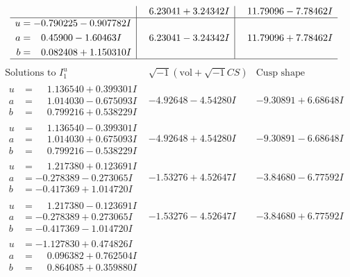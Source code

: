 \documentclass[1p]{elsarticle_modified}
\theoremstyle{definition}
\newcommand{\I}{\sqrt{-1}}
\begin{document}
$$\begin{array}{c|c|c}
 & \phantom{-}6.23041 + 3.24342 I & \phantom{-}11.79096 - 7.78462 I \\ \hline\begin{aligned}
u &= -0.790225 - 0.907782 I \\
a &= \phantom{-}0.45900 - 1.60463 I \\
b &= \phantom{-}0.082408 + 1.150310 I\end{aligned}
 & \phantom{-}6.23041 - 3.24342 I & \phantom{-}11.79096 + 7.78462 I\\
 \hline 
 \end{array}$$\newpage$$\begin{array}{c|c|c}  
\text{Solutions to }I^u_{1}& \I (\text{vol} + \sqrt{-1}CS) & \text{Cusp shape}\\
 \hline 
\begin{aligned}
u &= \phantom{-}1.136540 + 0.399301 I \\
a &= \phantom{-}1.014030 - 0.675093 I \\
b &= \phantom{-}0.799216 + 0.538229 I\end{aligned}
 & -4.92648 - 4.54280 I & -9.30891 + 6.68648 I \\ \hline\begin{aligned}
u &= \phantom{-}1.136540 - 0.399301 I \\
a &= \phantom{-}1.014030 + 0.675093 I \\
b &= \phantom{-}0.799216 - 0.538229 I\end{aligned}
 & -4.92648 + 4.54280 I & -9.30891 - 6.68648 I \\ \hline\begin{aligned}
u &= \phantom{-}1.217380 + 0.123691 I \\
a &= -0.278389 - 0.273065 I \\
b &= -0.417369 + 1.014720 I\end{aligned}
 & -1.53276 + 4.52647 I & -3.84680 - 6.77592 I \\ \hline\begin{aligned}
u &= \phantom{-}1.217380 - 0.123691 I \\
a &= -0.278389 + 0.273065 I \\
b &= -0.417369 - 1.014720 I\end{aligned}
 & -1.53276 - 4.52647 I & -3.84680 + 6.77592 I \\ \hline\begin{aligned}
u &= -1.127830 + 0.474826 I \\
a &= \phantom{-}0.096382 + 0.762504 I \\
b &= \phantom{-}0.864085 + 0.359880 I\end{aligned}

\end{array}$$
\end{document}
